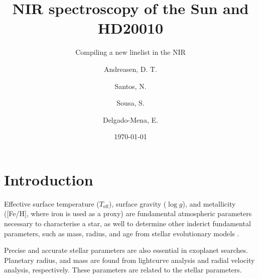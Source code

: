 \documentclass{aa}
\begin{document}
\title{NIR spectroscopy of the Sun and HD20010}
\subtitle{Compiling a new linelist in the NIR}

\subtitle{}

\author{Andreasen, D. T.\inst{\ref{inst1}, \ref{inst2}} \and
        Santos, N.\inst{\ref{inst1}} \and
        Sousa, S.\inst{\ref{inst1}} \and
        Delgado-Mena, E.\inst{\ref{inst1}}}



\date{\today}

\abstract{}{}{}{}



\maketitle



\section{Introduction}
\label{sec:introduction}
Effective surface temperature ($T_\mathrm{eff}$), surface gravity ($\log g$),
and metallicity ([Fe/H], where iron is used as a proxy) are fundamental
atmospheric parameters necessary to characterise a star, as well to determine
other inderict fundamental parameters, such as mass, radius, and age from
stellar evolutionary models \citep{Girardi2000}.

Precise and accurate stellar parameters are also essential in exoplanet
searches. Planetary radius, and mass are found from lightcurve analysis and
radial velocity analysis, respectively. These parameters are related to the
stellar parameters.




%
\end{document}
